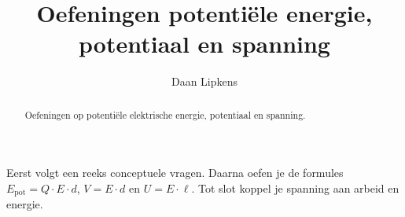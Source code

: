 \documentclass{ximera}
\title{Oefeningen potentiële energie, potentiaal en spanning}
\author{Daan Lipkens}
\begin{document}
\begin{abstract}
    Oefeningen op potentiële elektrische energie, potentiaal en spanning.
\end{abstract}
\maketitle

Eerst volgt een reeks conceptuele vragen. Daarna oefen je de formules $E_{\text{pot}} = Q \cdot E \cdot d$, $V = E \cdot d$ en $U = E \cdot \ell$. Tot slot koppel je spanning aan arbeid en energie.
\end{document}
